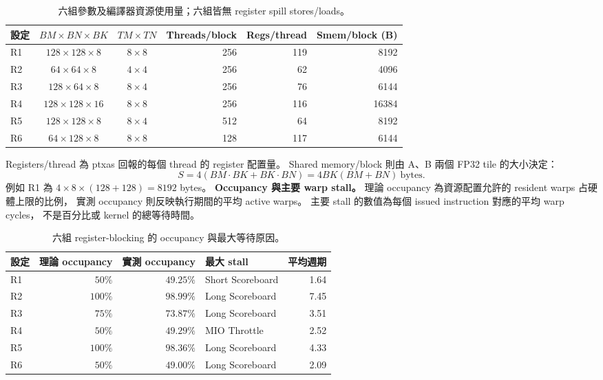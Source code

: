 \documentclass[UTF8,fontset=none,11pt,a4paper]{ctexart}
\begin{document}
\begin{table}[H]
\centering
\small
\begin{tabular}{@{}lccrrr@{}}
\toprule
設定 & $BM\times BN\times BK$ & $TM\times TN$ & Threads/block
     & Regs/thread & Smem/block (B) \\
\midrule
R1 & $128\times128\times8$  & $8\times8$ & 256 & 119 & 8192 \\
R2 & $64\times64\times8$    & $4\times4$ & 256 & 62  & 4096 \\
R3 & $128\times64\times8$   & $8\times4$ & 256 & 76  & 6144 \\
R4 & $128\times128\times16$ & $8\times8$ & 256 & 116 & 16384 \\
R5 & $128\times128\times8$  & $8\times4$ & 512 & 64  & 8192 \\
R6 & $64\times128\times8$   & $8\times8$ & 128 & 117 & 6144 \\
\bottomrule
\end{tabular}
\caption{六組參數及編譯器資源使用量；六組皆無 register spill stores/loads。}
\label{tab:part3-resources}
\end{table}

Registers/thread 為 ptxas 回報的每個 thread 的 register 配置量。
Shared memory/block 則由 A、B 兩個 FP32 tile 的大小決定：
\[
S=4(BM\cdot BK+BK\cdot BN)=4BK(BM+BN)\ \text{bytes}.
\]
例如 R1 為 $4\times8\times(128+128)=8192$ bytes。
\clearpage
\textbf{Occupancy 與主要 warp stall。}
理論 occupancy 為資源配置允許的 resident warps 占硬體上限的比例，
實測 occupancy 則反映執行期間的平均 active warps。
主要 stall 的數值為每個 issued instruction 對應的平均 warp cycles，
不是百分比或 kernel 的總等待時間。

\begin{table}[H]
\centering
\small
\begin{tabular}{@{}lrrlr@{}}
\toprule
設定 & 理論 occupancy & 實測 occupancy & 最大 stall & 平均週期 \\
\midrule
R1 & $50\%$  & $49.25\%$ & Short Scoreboard & 1.64 \\
R2 & $100\%$ & $98.99\%$ & Long Scoreboard  & 7.45 \\
R3 & $75\%$  & $73.87\%$ & Long Scoreboard  & 3.51 \\
R4 & $50\%$  & $49.29\%$ & MIO Throttle     & 2.52 \\
R5 & $100\%$ & $98.36\%$ & Long Scoreboard  & 4.33 \\
R6 & $50\%$  & $49.00\%$ & Long Scoreboard  & 2.09 \\
\bottomrule
\end{tabular}
\caption{六組 register-blocking 的 occupancy 與最大等待原因。}
\label{tab:part3-occupancy}
\end{table}
\end{document}
